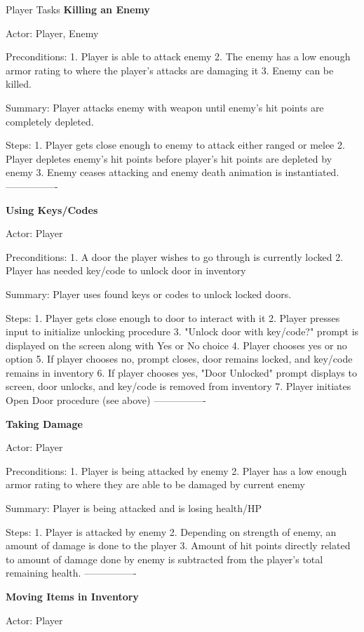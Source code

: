 \documentclass[12pt]{report}
\begin{document}
\begin {section}{Player Tasks}
\textbf{Killing an Enemy} %

Actor: Player, Enemy

Preconditions:
1. Player is able to attack enemy
2. The enemy has a low enough armor rating to where the player's attacks are damaging it
3. Enemy can be killed.

Summary: Player attacks enemy with weapon until enemy's hit points are completely depleted.

Steps:
1. Player gets close enough to enemy to attack either ranged or melee
2. Player depletes enemy's hit points before player's hit points are depleted by enemy
3. Enemy ceases attacking and enemy death animation is instantiated.
----------------

\textbf{Using Keys/Codes} %

Actor: Player

Preconditions:
1. A door the player wishes to go through is currently locked
2. Player has needed key/code to unlock door in inventory

Summary: Player uses found keys or codes to unlock locked doors.

Steps:
1. Player gets close enough to door to interact with it
2. Player presses input to initialize unlocking procedure
3. "Unlock door with key/code?" prompt is displayed on the screen along with Yes or No choice
4. Player chooses yes or no option
5. If player chooses no, prompt closes, door remains locked, and key/code remains in inventory
6. If player chooses yes, "Door Unlocked" prompt displays to screen, door unlocks, and key/code is removed from inventory
7. Player initiates Open Door procedure (see above)
----------------

\textbf{Taking Damage} %

Actor: Player

Preconditions:
1. Player is being attacked by enemy
2. Player has a low enough armor rating to where they are able to be damaged by current enemy

Summary: Player is being attacked and is losing health/HP

Steps:
1. Player is attacked by enemy
2. Depending on strength of enemy, an amount of damage is done to the player
3. Amount of hit points directly related to amount of damage done by enemy is subtracted from the player's total remaining health.
----------------

\textbf{Moving Items in Inventory} %

Actor: Player


\end{section}
\end{document}
